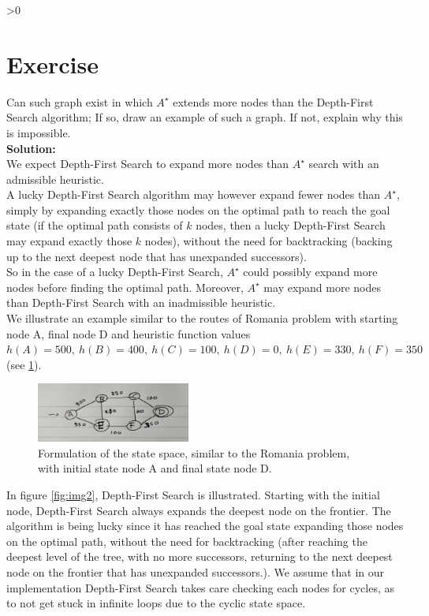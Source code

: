 \documentclass{article}
\newcounter{partCounter}
\newcounter{ExerciseCounter}
\newenvironment{Exercise}[1][-1]{
	\ifnum#1>0
	\setcounter{ExerciseCounter}{#1}
	\fi
	\section{Exercise \arabic{ExerciseCounter}}
	\setcounter{partCounter}{1}
}{
}
\newcommand{\solution}{\textbf{\large Solution:}}
\begin{document}
	\begin{Exercise}[2]
		Can such graph exist in which $A^{\star}$ extends more nodes than the Depth-First
		Search algorithm; If so, draw an example of such a graph. If not, explain why
		this is impossible. \\
		
		\solution \\
		
		We expect Depth-First Search to expand more nodes than $A^{\star}$ search with an admissible heuristic. \\ 
		
		A lucky Depth-First Search algorithm may however expand fewer nodes than $A^{\star}$, simply by expanding exactly those nodes on the optimal path to reach the goal state (if the optimal path consists of $k$ nodes, then a lucky Depth-First Search may expand exactly those $k$ nodes), without the need for backtracking (backing up to the next deepest node that has unexpanded successors). \\
		
		So in the case of a lucky Depth-First Search, $A^{\star}$ could possibly expand more nodes before finding the optimal path. Moreover, $A^{\star}$ may expand more nodes than Depth-First Search with an inadmissible heuristic. \\
		
		We illustrate an example similar to the routes of Romania problem with starting node A, final node D and heuristic function values $h(A) = 500, ~h(B) = 400, ~h(C) = 100, ~h(D) = 0, ~h(E) = 330, ~h(F) = 350$ (see \ref{fig:img1}).
		
		\begin{figure}[h]
			\centering
			\includegraphics[width=0.45\textwidth]{images/1.jpg}
			\caption{Formulation of the state space, similar to the Romania problem, with initial state node A and final state node D.}
			\label{fig:img1}
		\end{figure}
		
		In figure \ref{fig:img2}, Depth-First Search is illustrated. Starting with the initial node, Depth-First Search always expands the deepest node on the frontier. The algorithm is being lucky since it has reached the goal state expanding those nodes on the optimal path, without the need for backtracking (after reaching the deepest level of the tree, with no more successors, returning to the next deepest node on the frontier that has unexpanded successors.). We assume that in our implementation Depth-First Search takes care checking each nodes for cycles, as to not get stuck in infinite loops due to the cyclic state space. 
		

\end{Exercise}
\end{document}
